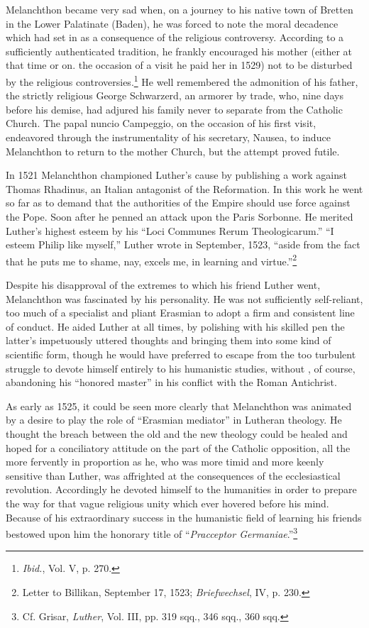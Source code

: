 Melanchthon became very sad when, on a journey to his native
town of Bretten in the Lower Palatinate (Baden), he was forced
to note the moral decadence which had set in as a consequence of
the religious controversy. According to a sufficiently authenticated
tradition, he frankly encouraged his mother (either at that time or
on. the occasion of a visit he paid her in 1529) not to be disturbed
by the religious controversies.\footnote{\textit{Ibid.}, Vol. V, p. 270.}
He well remembered the admonition of
his father, the strictly religious George Schwarzerd, an
armorer by trade, who, nine days before his demise, had adjured
his family never to separate from the Catholic Church. The papal
nuncio Campeggio, on the occasion of his first visit, endeavored
through the instrumentality of his secretary, Nausea, to induce
Melanchthon to return to the mother Church, but the attempt proved
futile.

In 1521 Melanchthon championed Luther’s cause by publishing
a work against Thomas Rhadinus, an Italian antagonist of the
Reformation. In this work he went so far as to demand that the
authorities of the Empire should use force against the Pope. Soon
after he penned an attack upon the Paris Sorbonne. He merited
Luther’s highest esteem by his “Loci Communes Rerum Theologicarum.” “I
esteem Philip like myself,” Luther wrote in September,
1523, “aside from the fact that he puts me to shame, nay, excels me,
in learning and virtue.”\footnote
{Letter to Billikan, September 17, 1523; \textit{Briefwechsel}, IV, p. 230.}

Despite his disapproval of the extremes to which his friend Luther
went, Melanchthon was fascinated by his personality. He was not
sufficiently self-reliant, too much of a specialist and pliant Erasmian
to adopt a firm and consistent line of conduct. He aided Luther
at all times, by polishing with his skilled pen the latter’s impetuously
uttered thoughts and bringing them into some kind of scientific
form, though he would have preferred to escape from the too turbulent
struggle to devote himself entirely to his humanistic studies, without
, of course, abandoning his “honored master” in his conflict
with the Roman Antichrist.

As early as 1525, it could be seen more clearly that Melanchthon
was animated by a desire to play the role of “Erasmian mediator”
in Lutheran theology. He thought the breach between the old and
the new theology could be healed and hoped for a conciliatory attitude
on the part of the Catholic opposition, all the more fervently
in proportion as he, who was more timid and more keenly sensitive
than Luther, was affrighted at the consequences of the ecclesiastical
revolution. Accordingly he devoted himself to the humanities in order
to prepare the way for that vague religious unity which ever hovered
before his mind. Because of his extraordinary success in the humanistic
field of learning his friends bestowed upon him the honorary title
of “\textit{Pracceptor Germaniae}.”\footnote
{Cf. Grisar, \textit{Luther}, Vol. III, pp. 319 sqq., 346 sqq., 360 sqq.}

